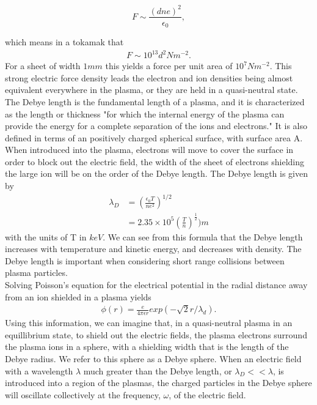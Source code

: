 \documentclass{article}
\begin{document}
$$F \sim \frac{(dne)^2}{\epsilon_0},$$

which means in a tokamak that
\begin{align*}
F \sim 10^{13} d^2 N m^{-2}.
\end{align*} 
For a sheet of width $1mm$ this yields a force per unit area of $10^7Nm^{-2}$. This strong electric force density leads the electron and ion densities being almost equivalent everywhere in the plasma, or they are held in a quasi-neutral state.\\
The Debye length is the fundamental length of a plasma, and it is characterized as the length or thickness "for which the internal energy of the plasma can provide the energy for a complete separation of the ions and electrons." \cite{Wesson} It is also defined in terms of an positively charged spherical surface, with surface area A. When introduced into the plasma, electrons will move to cover the surface in order to block out the electric field, the width of the sheet of electrons shielding the large ion will be on the order of the Debye length. The Debye length is given by
\begin{align*}
\lambda_D &= (\frac{\epsilon_0T}{ne^2})^{1/2}\\
		&=2.35\times10^5(\frac{T}{n})^{\frac{1}{2}})m
\end{align*}
with the units of T in $keV$. We can see from this formula that the Debye length increases with temperature and kinetic energy, and decreases with density. The Debye length is important when considering short range collisions between plasma particles.\\
Solving Poisson's equation for the electrical potential in the radial distance away from an ion shielded in a plasma yields
\begin{align*}
\phi(r) = \frac{e}{4\pi \epsilon r}exp(-\sqrt{2}r/\lambda_d).
\end{align*}
Using this information, we can imagine that, in a quasi-neutral plasma in an equillibrium state, to shield out the electric fields, the plasma electrons surround the plasma ions in a sphere, with a shielding width that is the length of the Debye radius. We refer to this sphere as a Debye sphere. When an electric field with a wavelength $\lambda$ much greater than the Debye length, or $\lambda_D << \lambda$, is introduced into a region of the plasmas, the charged particles in the Debye sphere will oscillate collectively at the frequency, $\omega$, of the electric field. 
\begin{align*}
\end{align*}
\end{document}
